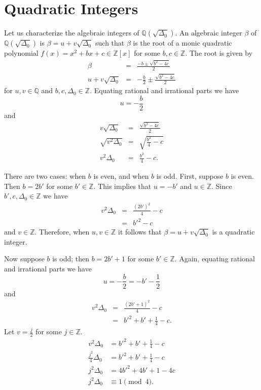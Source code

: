 \documentclass{ucalgthes1}
\theoremstyle{plain}
\theoremstyle{definition}
\newcommand{\ZZ}{\mathbb{Z}}
\newcommand{\QQ}{\mathbb{Q}}
\begin{document}
\bigbreak
\section{Quadratic Integers}
Let us characterize the algebraic integers of $\QQ(\sqrt{\Delta_0})$.  An algebraic integer $\beta$ of $\QQ(\sqrt{\Delta_0})$ is $\beta = u+v \sqrt{\Delta_0}$ such that $\beta$ is the root of a monic quadratic polynomial $f(x) = x^2+bx+c \in \ZZ[x]$ for some $b,c \in \ZZ$.  The root is given by
\begin{eqnarray*}
	\beta & = & \frac{-b \pm \sqrt{b^2-4c}}{2} \\
	u + v \sqrt{\Delta_0} & = & -\frac{b}{2} \pm \frac{\sqrt{b^2-4c}}{2}
\end{eqnarray*}
for $u,v \in \QQ$ and $b,c,\Delta_0 \in \ZZ$.
Equating rational and irrational parts we have
\[
	u = -\frac{b}{2}
\]
and
\begin{eqnarray*}
	v \sqrt{\Delta_0} & = & \frac{\sqrt{b^2 -4c}}{2} \\
	\sqrt{v^2 \Delta_0} & = & \sqrt{\frac{b^2}{4} - c} \\
	v^2 \Delta_0 & = & \frac{b^2}{4} - c.
\end{eqnarray*}


There are two cases: when $b$ is even, and when $b$ is odd.  First, suppose $b$ is even.  Then $b=2b'$ for some $b' \in \ZZ$.  This implies that $u = -b'$ and $u \in \ZZ$.  Since $b', c, \Delta_0 \in \ZZ$ we have
\begin{eqnarray*}
	v^2 \Delta_0 & = & \frac{(2b')^2}{4} - c \\
	& = & b'^2 - c
\end{eqnarray*}
and $v \in \ZZ$.  Therefore, when $u, v \in \ZZ$ it follows that $\beta = u + v \sqrt{\Delta_0}$ is a quadratic integer.

\bigbreak
Now suppose $b$ is odd; then $b=2b' + 1$ for some $b' \in \ZZ$.  Again, equating rational and irrational parts we have
\[
	u = - \frac{b}{2} = -b' - \frac{1}{2}
\]
and
\begin{eqnarray*}
	v^2 \Delta_0 & = & \frac{(2b'+1)^2}{4} - c \\
	& = & b'^2 + b' + \frac{1}{4} -c.
\end{eqnarray*}
Let $v = \frac{j}{2}$ for some $j \in \ZZ$.  
\begin{align*}
	v^2 \Delta_0 & = b'^2 + b' + \frac{1}{4} -c \\
	\frac{j^2}{4} \Delta_0 & = b'^2 + b' + \frac{1}{4} -c \\
	j^2 \Delta_0 & = 4b'^2 + 4b' + 1 - 4c \\
	j^2 \Delta_0 & \equiv 1 \pmod 4.
\end{align*}
\end{document}
